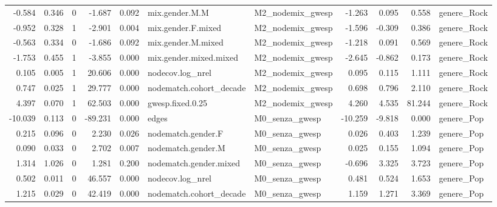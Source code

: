 \begin{table}
\begin{tabular}{rrrrrllrrrl}
   -0.584 & 0.346 &        0 &   -1.687 &     0.092 &          mix.gender.M.M & M2\_nodemix\_gwesp &  -1.263 &   0.095 &   0.558 &                 genere\_Rock \\
   -0.952 & 0.328 &        1 &   -2.901 &     0.004 &      mix.gender.F.mixed & M2\_nodemix\_gwesp &  -1.596 &  -0.309 &   0.386 &                 genere\_Rock \\
   -0.563 & 0.334 &        0 &   -1.686 &     0.092 &      mix.gender.M.mixed & M2\_nodemix\_gwesp &  -1.218 &   0.091 &   0.569 &                 genere\_Rock \\
   -1.753 & 0.455 &        1 &   -3.855 &     0.000 &  mix.gender.mixed.mixed & M2\_nodemix\_gwesp &  -2.645 &  -0.862 &   0.173 &                 genere\_Rock \\
    0.105 & 0.005 &        1 &   20.606 &     0.000 &        nodecov.log\_nrel & M2\_nodemix\_gwesp &   0.095 &   0.115 &   1.111 &                 genere\_Rock \\
    0.747 & 0.025 &        1 &   29.777 &     0.000 & nodematch.cohort\_decade & M2\_nodemix\_gwesp &   0.698 &   0.796 &   2.110 &                 genere\_Rock \\
    4.397 & 0.070 &        1 &   62.503 &     0.000 &        gwesp.fixed.0.25 & M2\_nodemix\_gwesp &   4.260 &   4.535 &  81.244 &                 genere\_Rock \\
  -10.039 & 0.113 &        0 &  -89.231 &     0.000 &                   edges &   M0\_senza\_gwesp & -10.259 &  -9.818 &   0.000 &                  genere\_Pop \\
    0.215 & 0.096 &        0 &    2.230 &     0.026 &      nodematch.gender.F &   M0\_senza\_gwesp &   0.026 &   0.403 &   1.239 &                  genere\_Pop \\
    0.090 & 0.033 &        0 &    2.702 &     0.007 &      nodematch.gender.M &   M0\_senza\_gwesp &   0.025 &   0.155 &   1.094 &                  genere\_Pop \\
    1.314 & 1.026 &        0 &    1.281 &     0.200 &  nodematch.gender.mixed &   M0\_senza\_gwesp &  -0.696 &   3.325 &   3.723 &                  genere\_Pop \\
    0.502 & 0.011 &        0 &   46.557 &     0.000 &        nodecov.log\_nrel &   M0\_senza\_gwesp &   0.481 &   0.524 &   1.653 &                  genere\_Pop \\
    1.215 & 0.029 &        0 &   42.419 &     0.000 & nodematch.cohort\_decade &   M0\_senza\_gwesp &   1.159 &   1.271 &   3.369 &                  genere\_Pop \\

\end{tabular}
\end{table}
